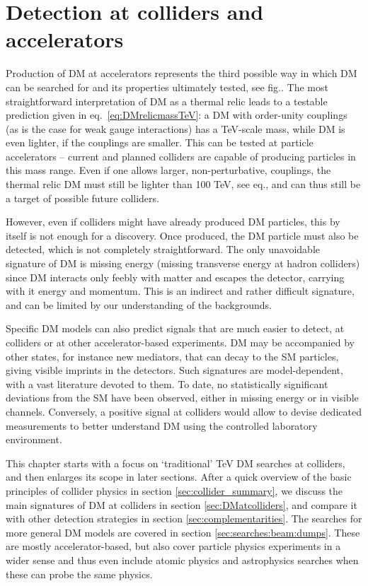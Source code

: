 \chapter{Detection at colliders and accelerators}\label{chapter:collider}
Production of DM at accelerators represents  the third possible way in which DM can be searched for and its properties ultimately tested, see fig..
The most straightforward interpretation of DM as a thermal relic leads to a testable prediction given in eq.~\eqref{eq:DMrelicmassTeV}:
a DM with order-unity couplings (as is the case for weak gauge interactions) has a TeV-scale mass, while DM is even lighter, if the couplings are smaller. 
This can be tested at particle accelerators -- current and planned colliders are capable of producing particles in this mass range. 
 Even if one allows larger, non-perturbative, couplings, the thermal relic DM must still be lighter than 100 TeV, see eq., 
and can thus still be a target of possible future colliders. 


However, even if colliders might have already produced DM particles, this by itself is not enough for a discovery. 
Once produced, the DM particle must also be detected, which is not completely straightforward. 
The only unavoidable signature of DM is missing energy (missing transverse energy at hadron colliders) since DM interacts only feebly  with matter and escapes the detector, carrying with it energy and momentum.
This is an indirect and  rather difficult signature, and can be limited by our understanding of the backgrounds.

Specific DM models can also predict signals that are much easier to detect, at colliders or at other accelerator-based experiments. DM may be accompanied by other states, for instance new mediators, that can decay to the SM particles, giving visible imprints in the detectors. 
Such signatures are model-dependent, with a vast literature devoted to them. 
To date, no statistically significant deviations from the SM have been observed, either in missing energy or in visible channels.
Conversely,  a positive signal at colliders would allow to devise dedicated measurements 
to better understand DM using the controlled laboratory environment. 

\medskip

This chapter starts with a focus on `traditional' TeV DM searches at colliders, and then enlarges its scope in later sections. After a quick overview of the basic principles of collider physics in section \ref{sec:collider_summary}, we discuss the main signatures of DM at colliders in section \ref{sec:DMatcolliders}, and compare it with other detection strategies in section \ref{sec:complementarities}. The searches for more general DM models  are covered in section \ref{sec:searches:beam:dumps}. These are mostly accelerator-based, but also cover particle physics experiments in a wider sense and thus even include atomic physics and astrophysics searches when these can probe the same physics. 

